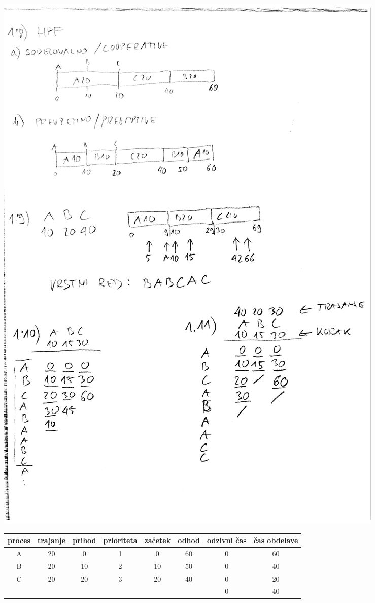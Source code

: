\begin{Answer}
\begin{center}
\includegraphics[width=.9\textwidth]{razvrscanje/1.8-HPF-preemptive.pdf}\\
\begin{tabular}{c|ccc|cc|cc}
proces & trajanje & prihod & prioriteta & začetek & odhod & odzivni čas & čas obdelave \\
\hline
A & 20 &  0 &  1 &   0 & 60 & 0 & 60 \\
B & 20 & 10 & 2 & 10 & 50 & 0 & 40 \\
C & 20 & 20 & 3 & 20 & 40 & 0 & 20 \\
\hline
& & & & & & 0 & 40
\end{tabular}
\end{center}
\end{Answer}



